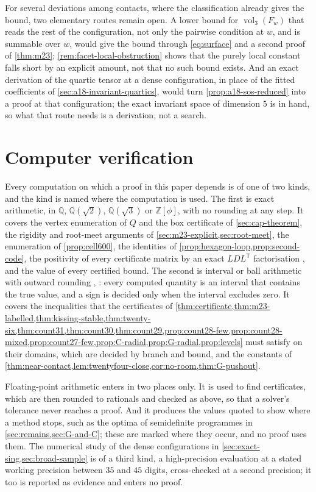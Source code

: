\documentclass[11pt,reqno]{amsart}
\renewcommand{\_}{\origunderscore\allowbreak}
\numberwithin{equation}{section}
\theoremstyle{plain}
\theoremstyle{definition}
\theoremstyle{remark}
\DeclareMathOperator{\vol}{vol}
\begin{document}
For several deviations among contacts, where the classification already
gives the bound, two elementary routes remain open. A lower bound for
$\vol_3(F_w)$ that reads the rest of the configuration, not only the
pairwise condition at $w$, and is summable over $w$, would give the bound
through \eqref{eq:surface} and a second proof of \cref{thm:m23};
\cref{rem:facet-local-obstruction} shows that the purely local constant
falls short by an explicit amount, not that no such bound exists. And an
exact derivation of the quartic tensor at a dense configuration, in place
of the fitted coefficients of \cref{sec:a18-invariant-quartics}, would turn
\cref{prop:a18-sos-reduced} into a proof at that configuration; the exact
invariant space of dimension $5$ is in hand, so what that route needs is a
derivation, not a search.

\section{Computer verification}\label{sec:reproducibility-new}

Every computation on which a proof in this paper depends is of one of two
kinds, and the kind is named where the computation is used. The first is
exact arithmetic, in $\mathbb{Q}$, $\mathbb{Q}(\sqrt2)$, $\mathbb{Q}(\sqrt3)$
or $\mathbb{Z}[\phi]$, with no rounding at any step. It covers the vertex
enumeration of $Q$ and the box certificate of \cref{sec:cap-theorem}, the
rigidity and root-meet arguments of \cref{sec:m23-explicit,sec:root-meet},
the enumeration of \cref{prop:cell600}, the identities of
\cref{prop:hexagon-loop,prop:second-code}, the positivity of every
certificate matrix by an exact $LDL^{\mathsf T}$ factorisation
\cite[\S4.1]{GVL13}, and the value of every certified bound. The second is
interval or ball arithmetic with outward rounding \cite[Ch.~5]{MKC09},
\cite{Joh17}: every computed quantity is an interval that contains the true
value, and a sign is decided only when the interval excludes zero. It covers
the inequalities that the certificates of
\cref{thm:certificate,thm:m23-labelled,thm:kissing-stable,thm:twenty-six,thm:count31,thm:count30,thm:count29,prop:count28-few,prop:count28-mixed,prop:count27-few,prop:C-radial,prop:G-radial,prop:levels}
must satisfy on their domains, which are decided by branch and bound, and
the constants of \cref{thm:near-contact,lem:twentyfour-close,cor:no-room,thm:G-pushout}.

Floating-point arithmetic enters in two places only. It is used to find
certificates, which are then rounded to rationals and checked as above, so
that a solver's tolerance never reaches a proof. And it produces the values
quoted to show where a method stops, such as the optima of semidefinite
programmes in \cref{sec:remains,sec:G-and-C}; these are marked where they
occur, and no proof uses them. The numerical study of the dense
configurations in \cref{sec:exact-sing,sec:broad-sample} is of a third
kind, a high-precision evaluation at a stated working precision between
$35$ and $45$ digits, cross-checked at a second precision; it too is
reported as evidence and enters no proof.
\end{document}
